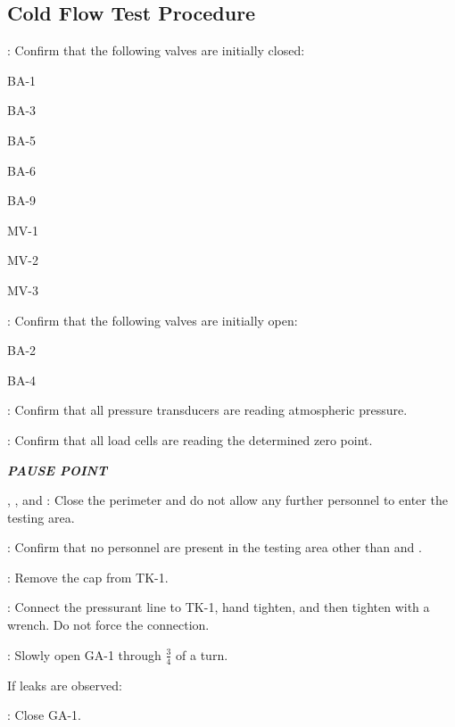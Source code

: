 \subsection{Cold Flow Test Procedure}
\begin{checklist}
    \item \primary{}: Confirm that the following valves are initially closed:
    \begin{checklist}
		\item BA-1
        \item BA-3
        \item BA-5
        \item BA-6
		\item BA-9
		\item MV-1
		\item MV-2
		\item MV-3
    \end{checklist}
    \item \primary{}: Confirm that the following valves are initially open:
    \begin{checklist}
  		\item BA-2
		\item BA-4
    \end{checklist}
    \item \daq{}: Confirm that all pressure transducers are reading atmospheric pressure.
    \item \daq{}: Confirm that all load cells are reading the determined zero point.
    \item \textbf{\textit{PAUSE POINT}}
    \item \peri{}, \perii{}, and \periii{}: Close the perimeter and do not allow any further personnel to enter the testing area.
    \item \secondary: Confirm that no personnel are present in the testing area other than \primary{} and \secondary.
    \item \primary{}: Remove the cap from TK-1.
    \item \primary{}: Connect the pressurant line to TK-1, hand tighten, and then tighten with a wrench. Do not force the connection.
    \item \primary{}: Slowly open GA-1 through $\frac{3}{4}$  of a turn.
    \begin{checklist}[label=$\bullet$]
        \item If leaks are observed:
        \begin{checklist}
            \item \primary{}: Close GA-1.

\end{checklist}
\end{checklist}
\end{checklist}
